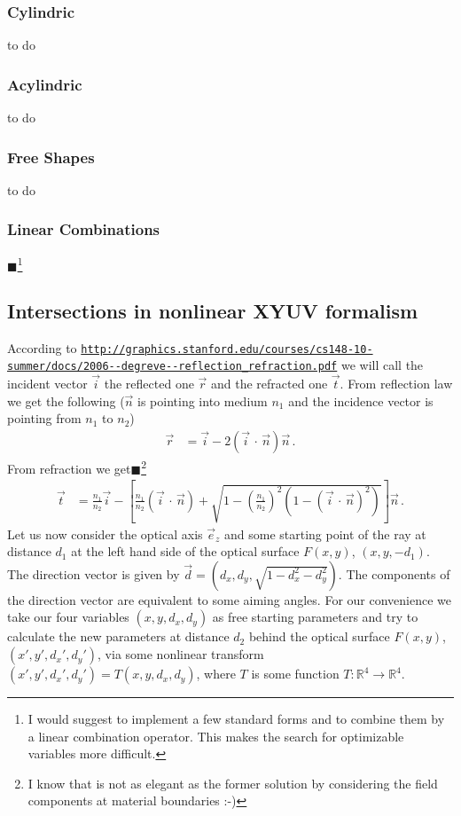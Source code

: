 \documentclass[12pt,a4paper,twoside,openright,BCOR10mm,headsepline,titlepage,abstracton,chapterprefix,final]{scrreprt}
\newcommand{\scpm}[2]{(#1\,\cdot\,#2)}
\newcommand{\remark}[1]{{\color{red}$\blacksquare$}\footnote{{\color{red}#1}}}
\begin{document}
\subsubsection{Cylindric}
to do
\subsubsection{Acylindric}
to do
\subsubsection{Free Shapes}
to do

\subsubsection{Linear Combinations}
\remark{I would suggest to implement a few standard forms and to combine them by a linear combination operator. This makes the search for optimizable
variables more difficult.}
\subsection{Intersections in nonlinear XYUV formalism}
According to {{\tt \url{http://graphics.stanford.edu/courses/cs148-10-summer/docs/2006--degreve--reflection_refraction.pdf}}}
we will call the incident vector $\vec{i}$ the reflected one $\vec{r}$ and the refracted one $\vec{t}$.
From reflection law we get the following ($\vec{n}$ is pointing into medium $n_1$ and the incidence vector is pointing from $n_1$ to $n_2$)
\begin{align}
 \vec{r} &= \vec{i} - 2 \scpm{\vec{i}}{\vec{n}} \vec{n}\,.\label{eq:reflection_vector}
\end{align}
From refraction we get\remark{I know that is not as elegant as the former 
solution by considering the field components at material boundaries :-)}
\begin{align}
 \vec{t} &= \frac{n_1}{n_2} \vec{i} 
 - \left[\frac{n_1}{n_2} \scpm{\vec{i}}{\vec{n}} 
      + \sqrt{1 - \left(\frac{n_1}{n_2}\right)^2 (1 - {\scpm{\vec{i}}{\vec{n}}}^2)}\right] \vec{n}\,.\label{eq:refraction_vector}
\end{align}
Let us now consider the optical axis $\vec{e}_z$ and some starting point of the ray at distance $d_1$ at the left hand side
of the optical surface $F(x, y)$, $(x,y,-d_1)$. The direction vector is given by $\vec{d} = (d_x, d_y, \sqrt{1 - d_x^2 - d_y^2})$.
The components of the direction vector are equivalent to some aiming angles. For our convenience we take our
four variables $(x, y, d_x, d_y)$ as free starting parameters and try to calculate the new parameters at distance $d_2$ behind the
optical surface $F(x, y)$, $(x', y', {d_x}', {d_y}')$, via some nonlinear transform $(x', y', {d_x}', {d_y}') = T(x, y, d_x, d_y)$,
where $T$ is some function $T:\mathbb{R}^4 \to \mathbb{R}^4$.
\end{document}
